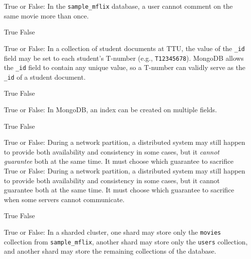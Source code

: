 \documentclass[12pt,answers]{exam}
\begin{document}
\begin{questions}
\begin{minipage}{\linewidth}
\question[2]
True or False: In the \texttt{sample\_mflix} database, 
a user cannot comment on the same movie more than once.

\begin{checkboxes}
    \choice True
    \CorrectChoice False
\end{checkboxes}
\end{minipage}

\begin{minipage}{\linewidth}
\question[2]
True or False: In a collection of student documents at TTU, the value of the \texttt{\_id} field may be set to each student's T-number (e.g., \texttt{T12345678}). MongoDB allows the \texttt{\_id} field to contain any unique value, so a T-number can validly serve as the \texttt{\_id} of a student document.

\begin{checkboxes}
    \CorrectChoice True
    \choice False
\end{checkboxes}
\end{minipage}

\begin{minipage}{\linewidth}
\question[2]
True or False: In MongoDB, an index can be created on multiple fields.

\begin{checkboxes}
    \CorrectChoice True
    \choice False
\end{checkboxes}
\end{minipage}

\begin{minipage}{\linewidth}
\question[2]
True or False: During a network partition, a distributed system may still happen to provide both availability and consistency in some cases, but it \emph{cannot guarantee} both at the same time. It must choose which guarantee to sacrifice True or False: During a network partition, a distributed system may still happen to provide both availability and consistency in some cases, but it cannot guarantee both at the same time. It must choose which guarantee to sacrifice when some servers cannot communicate.

\begin{checkboxes}
    \CorrectChoice True
    \choice False
\end{checkboxes}
\end{minipage}



\begin{minipage}{\linewidth}
\question[2]
True or False: In a sharded cluster, one shard may store only the \texttt{movies} collection from \texttt{sample\_mflix}, another shard may store only the \texttt{users} collection, and another shard may store the remaining collections of the database.


\end{minipage}
\end{questions}
\end{document}
